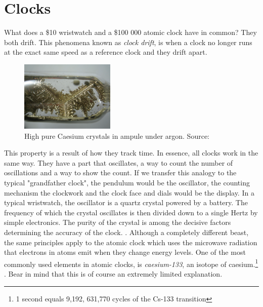 \documentclass[12pt,english,a4paper]{article}
\begin{document}
\section{Clocks}
What does a \$10 wristwatch and a \$100 000 atomic clock have in common? They both drift. This phenomena known as \textit{clock drift}, is when a clock no longer runs at the exact same speed as a reference clock and they drift apart.
\begin{figure}
  \centering
  \includegraphics[width=0.40\textwidth]{cscrystals.jpg}
  \caption[Caesium campule]
   {High pure Caesium crystals in ampule under argon. Source: \cite{DENCES}}
\end{figure} 
This property is a result of how they track time. In essence, all clocks work in the same way. They have a part that oscillates, a way to count the number of oscillations and a way to show the count. If we transfer this analogy to the typical "grandfather clock", the pendulum would be the oscillator, the counting mechanism the clockwork and the clock face and dials would be the display. In a typical wristwatch, the oscillator is a quartz crystal powered by a battery. The frequency of which the crystal oscillates is then divided down to a single Hertz by simple electronics. The purity of the crystal is among the decisive factors determining the accuracy of the clock. \cite{CSMG}. 
Although a completely different beast, the same principles apply to the atomic clock which uses the microwave radiation that electrons in atoms emit when they change energy levels. One of the most commonly used elements in atomic clocks, is \textit{caesium-133}, an isotope of caesium.\footnote{1 second equals 9,192, 631,770 cycles of the Cs-133 transition} \cite{HP}. Bear in mind that this is of course an extremely limited explanation.
\end{document}
